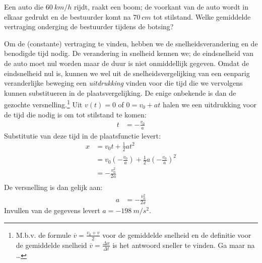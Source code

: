 \documentclass{ximera}
\begin{document}
\begin{exercise}
    Een auto die $\SI{60}{km/h}$ rijdt, raakt een boom; de voorkant van de auto wordt in elkaar gedrukt en de bestuurder komt na $\SI{70}{cm}$ tot stilstand. Welke gemiddelde vertraging onderging de bestuurder tijdens de botsing?%
    \begin{oplossing} 
    Om de (constante) vertraging te vinden, hebben we de snelheidsverandering en de benodigde tijd nodig. De verandering in snelheid kennen we; de eindsnelheid van de auto moet nul worden maar de duur is niet onmiddellijk gegeven. Omdat de eindsnelheid nul is, kunnen we wel uit de snelheidsvergelijking van een eenparig veranderlijke beweging een \emph{uitdrukking} vinden voor die tijd die we vervolgens kunnen substitueren in de plaatsvergelijking. De enige onbekende is dan de gezochte versnelling.\footnote{M.b.v. de formule $\overline{v}=\frac{v_0+v}{2}$ voor de gemiddelde snelheid en de definitie voor de gemiddelde snelheid $\overline{v}=\frac{\Delta x}{\Delta t}$ is het antwoord sneller te vinden. Ga maar na \ldots}
    Uit $v(t)=0$ of $0=v_0+at$ halen we een uitdrukking voor de tijd die nodig is om tot stilstand te komen:
    \begin{align*}
    t&=-\frac{v_0}{a}
    \end{align*}
    Substitutie van deze tijd in de plaatsfunctie levert:
    \begin{align*}
    x&=v_0t+\frac{1}{2}at^2\\
    &=v_0\left(-\frac{v_0}{a}\right)+\frac{1}{2}a\left(-\frac{v_0}{a}\right)^2\\
    &=-\frac{v_0^2}{2a}\\
    \end{align*}
    De versnelling is dan gelijk aan:
    \begin{align*}
    a&=-\frac{v_0^2}{2x}
    \end{align*}
    Invullen van de gegevens levert $a=\SI{-198}{m/s^2}$.%
    \end{oplossing}
    \end{exercise}
    
\end{document}
